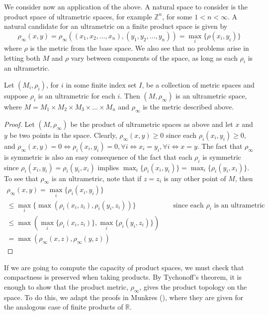 We consider now an application of the above. A natural space to consider is the product space of ultrametric spaces, for example $\mathbb{Z}^n$, for some $1 < n < \infty$. A natural candidate for an ultrametric on a finite product space is given by
\[ \rho_\infty(x,y) = \rho_\infty((x_1,x_2,\ldots,x_n),(y_1,y_2, \ldots, y_n)) = \max_{i} \{\rho(x_i, y_i)\}\] where $\rho$ is the metric from the base space.  We also see that no problems arise in letting both $M$ and $\rho$ vary between components of the space, as long as each $\rho_i$ is an ultrametric.\\

\begin{proposition}
Let $(M_i, \rho_i)$, for $i$ in some finite index set $I$, be a collection of metric spaces and suppose $\rho_i$ is an ultrametric for each $i$. Then $(M,\rho_\infty)$ is an ultrametric space, where $M=M_1 \times M_2 \times M_3 \times \ldots \times M_n$ and $\rho_\infty$ is the metric described above.
\end{proposition}

\begin{proof}
Let $(M, \rho_\infty)$ be the product of ultrametric spaces as above and let $x$ and $y$ be two points in the space. Clearly, $\rho_\infty(x,y) \geq 0$ since each $\rho_i(x_i,y_i) \geq 0$, and $\rho_\infty(x,y) = 0 \iff \rho_i(x_i,y_i) =0,\forall i \iff x_i=y_i, \forall i \iff x=y$. The fact that $\rho_\infty$ is symmetric is also an easy consequence of the fact that each $\rho_i$ is symmetric since  $\rho_i(x_i, y_i) = \rho_i(y_i, x_i)$ implies $\max_{i}\{\rho_i(x_i, y_i)\} = \max_i\{\rho_i(y_i, x_i)\}$. To see that $\rho_\infty$ is an ultrametric, note that if $z=z_i$ is any other point of $M$, then
\begin{align*}
    \rho_\infty(x, y) = \max_i\{\rho_i(x_i,y_i)\} && \\
    \leq \max_i\{\max(\rho_i(x_i,z_i),\rho_i(y_i,z_i))\} && \text{ since each $\rho_i$ is an ultrametric } \\
    \leq \max(\max_i\{\rho_i(x_i,z_i)\}, \max_i\{\rho_i(y_i,z_i)\})  \\
    = \max(\rho_\infty(x,z),\rho_\infty(y,z))  
\end{align*}
\end{proof}

If we are going to compute the capacity of product spaces, we must check that compactness is preserved when taking products. By Tychonoff's theorem, it is enough to show that the product metric, $\rho_\infty$, gives the product topology on the space. To do this, we adapt the proofs in Munkres (\cite{mun}), where they are given for the analogous case of finite products of $\mathbb{R}$.\\

